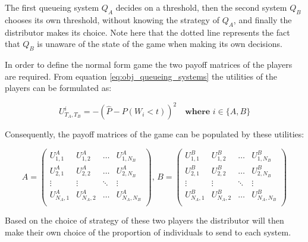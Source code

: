 The first 
queueing system \(Q_A\) decides on a threshold, then the second system \(Q_B\)
chooses its own threshold, without knowing the strategy of \(Q_A\), and finally
the distributor makes its choice. Note here that the dotted line represents the
fact that \(Q_B\) is unaware of the state of the game when making its own 
decisions. 

In order to define the normal form game the two payoff matrices of the players 
are required. From equation \ref{eq:obj_queueing_systems} the utilities of the
players can be formulated as:

\begin{equation} \label{eq:payoff_entry}
    U_{T_A, T_B}^i = -\left( 
        \hat{P} - P(W_i < t) 
    \right)^2 \quad \textbf{where } i \in \{A, B\}
\end{equation}

Consequently, the payoff matrices of the game can be populated by these 
utilities:

\begin{equation} \label{eq:payoff_matrices}
    A = 
    \begin{pmatrix}
        U_{1,1}^A & U_{1,2}^A & \dots & U_{1,N_B}^A \\
        U_{2,1}^A & U_{2,2}^A & \dots & U_{2,N_B}^A \\
        \vdots & \vdots & \ddots & \vdots \\
        U_{N_A,1}^A & U_{N_A,2}^A & \dots & U_{N_A,N_B}^A \\
    \end{pmatrix}, \,
    B = 
    \begin{pmatrix}
        U_{1,1}^B & U_{1,2}^B & \dots & U_{1,N_B}^B \\
        U_{2,1}^B & U_{2,2}^B & \dots & U_{2,N_B}^B \\
        \vdots & \vdots & \ddots & \vdots \\
        U_{N_A,1}^B & U_{N_A,2}^B & \dots & U_{N_A,N_B}^B \\
    \end{pmatrix}
\end{equation}

Based on the choice of strategy of these two players the distributor will then 
make their own choice of the proportion of individuals to send to each system.

